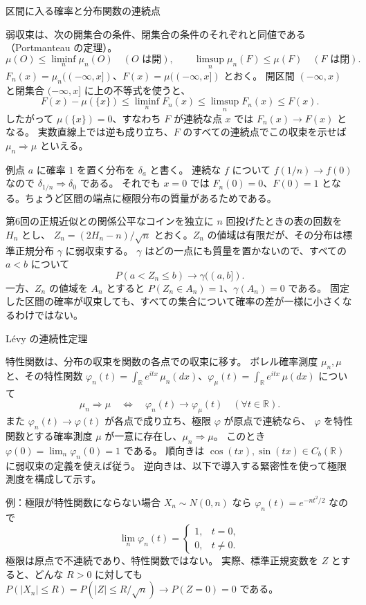 \documentclass[a4paper,10pt,pdflatex,ja=standard,jafont=ipaex-type1,
  magstyle=real,scale=1]{bxjsarticle}
\newcommand{\topic}[1]{\par\vspace{5pt}
  {\large\sffamily\mdseries\color{accent}#1}\par\vspace{2pt}}
\newcommand{\examplelabel}[1]{{\sffamily\mdseries\color{ink}#1}}
\newcommand{\R}{\mathbb R}
\begin{document}
\topic{区間に入る確率と分布関数の連続点}
弱収束は、次の開集合の条件、閉集合の条件のそれぞれと同値である（Portmanteau の定理）。
$$\mu(O)\le\liminf_n\mu_n(O)\quad(O\text{ は開}),\qquad
 \limsup_n\mu_n(F)\le\mu(F)\quad(F\text{ は閉}).$$
$F_n(x)=\mu_n((-\infty,x])$、$F(x)=\mu((-\infty,x])$ とおく。
開区間 $(-\infty,x)$ と閉集合 $(-\infty,x]$ に上の不等式を使うと、
$$F(x)-\mu(\{x\})\le\liminf_n F_n(x)\le\limsup_n F_n(x)\le F(x).$$
したがって $\mu(\{x\})=0$、すなわち $F$ が連続な点 $x$ では $F_n(x)\to F(x)$ となる。
実数直線上では逆も成り立ち、$F$ のすべての連続点でこの収束を示せば $\mu_n\Rightarrow\mu$ といえる。

\examplelabel{例}\quad 点 $a$ に確率 $1$ を置く分布を $\delta_a$ と書く。
連続な $f$ について $f(1/n)\to f(0)$ なので $\delta_{1/n}\Rightarrow\delta_0$ である。
それでも $x=0$ では $F_n(0)=0$、$F(0)=1$ となる。ちょうど区間の端点に極限分布の質量があるためである。

\examplelabel{第6回の正規近似との関係}\quad 公平なコインを独立に $n$ 回投げたときの表の回数を $H_n$ とし、
$Z_n=(2H_n-n)/\sqrt n$ とおく。$Z_n$ の値域は有限だが、その分布は標準正規分布 $\gamma$ に弱収束する。
$\gamma$ はどの一点にも質量を置かないので、すべての $a<b$ について
$$P(a<Z_n\le b)\longrightarrow\gamma((a,b]).$$
一方、$Z_n$ の値域を $A_n$ とすると $P(Z_n\in A_n)=1$、$\gamma(A_n)=0$ である。
固定した区間の確率が収束しても、すべての集合について確率の差が一様に小さくなるわけではない。

\newpage
\topic{L\'evy の連続性定理}
特性関数は、分布の収束を関数の各点での収束に移す。
ボレル確率測度 $\mu_n,\mu$ と、その特性関数
$\varphi_n(t)=\int_\R e^{itx}\,\mu_n(dx)$、$\varphi_\mu(t)=\int_\R e^{itx}\,\mu(dx)$ について
$$\mu_n\Rightarrow\mu\quad\Longleftrightarrow\quad
 \varphi_n(t)\to\varphi_\mu(t)\quad(\forall t\in\R).$$
また $\varphi_n(t)\to\varphi(t)$ が各点で成り立ち、極限 $\varphi$ が原点で連続なら、
$\varphi$ を特性関数とする確率測度 $\mu$ が一意に存在し、$\mu_n\Rightarrow\mu$。
このとき $\varphi(0)=\lim_n\varphi_n(0)=1$ である。
順向きは $\cos(tx),\sin(tx)\in C_b(\R)$ に弱収束の定義を使えば従う。
逆向きは、以下で導入する緊密性を使って極限測度を構成して示す。

\examplelabel{例：極限が特性関数にならない場合}
$X_n\sim N(0,n)$ なら $\varphi_n(t)=e^{-nt^2/2}$ なので
$$\lim_n\varphi_n(t)=\begin{cases}1,&t=0,\\0,&t\ne0.\end{cases}$$
極限は原点で不連続であり、特性関数ではない。
実際、標準正規変数を $Z$ とすると、どんな $R>0$ に対しても
$P(|X_n|\le R)=P(|Z|\le R/\sqrt n)\to P(Z=0)=0$ である。
\end{document}
